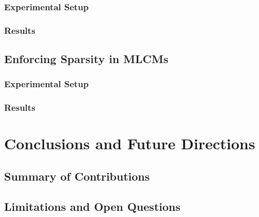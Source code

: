 \documentclass[a4paper,12pt]{report}
\begin{document}
\subsection{Experimental Setup}
\subsection{Results}

\section{Enforcing Sparsity in MLCMs}

\subsection{Experimental Setup}
\subsection{Results}

\chapter{Conclusions and Future Directions}
\section{Summary of Contributions}
\section{Limitations and Open Questions}




\appendix
\end{document}
